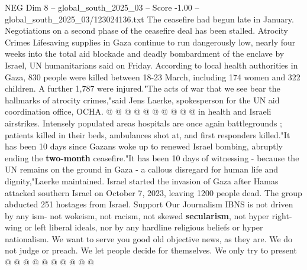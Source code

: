 \begin{textsample}{NEG Dim 8 – global\_south\_2025\_03 – Score -1.00 – global\_south\_2025\_03/123024136.txt}
The ceasefire had begun late in January.
Negotiations on a second phase of the ceasefire deal has been stalled.
Atrocity Crimes Lifesaving supplies in Gaza continue to run dangerously low, nearly four weeks into the total aid blockade and deadly bombardment of the enclave by Israel, UN humanitarians said on Friday.
According to local health authorities in Gaza, 830 people were killed between 18-23 March, including 174 women and 322 children.
A further 1,787 were injured."The acts of war that we see bear the hallmarks of atrocity crimes,"said Jens Laerke, spokesperson for the UN aid coordination office, OCHA. @ @ @ @ @ @ @ @ @ @ in health and Israeli airstrikes.
Intensely populated areas hospitals are once again battlegrounds ; patients killed in their beds, ambulances shot at, and first responders killed."It has been 10 days since Gazans woke up to renewed Israel bombing, abruptly ending the \textbf{two-month} ceasefire."It has been 10 days of witnessing - because the UN remains on the ground in Gaza - a callous disregard for human life and dignity,"Laerke maintained.
Israel started the invasion of Gaza after Hamas attacked southern Israel on October 7, 2023, leaving 1200 people dead.
The group abducted 251 hostages from Israel.
Support Our Journalism IBNS is not driven by any ism- not wokeism, not racism, not skewed \textbf{secularism}, not hyper right-wing or left liberal ideals, nor by any hardline religious beliefs or hyper nationalism.
We want to serve you good old objective news, as they are.
We do not judge or preach.
We let people decide for themselves.
We only try to present @ @ @ @ @ @ @ @ @ @

\end{textsample}
